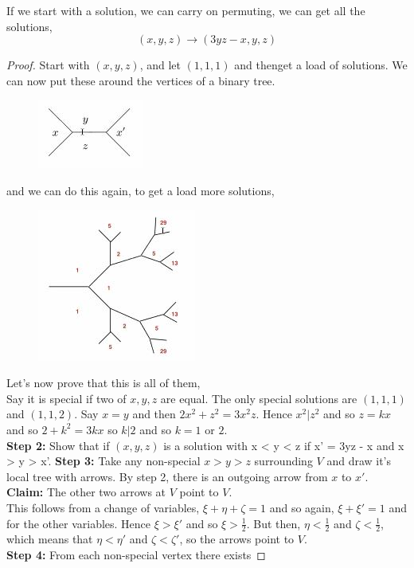 \documentclass{article}
\begin{document}
\begin{nthm}
  If we start with a solution, we can carry on permuting, we can get all the solutions,
  $$ (x, y, z) \to (3yz - x, y, z) $$
\end{nthm}
\begin{proof}
  Start with $(x, y, z)$, and let $(1, 1, 1)$ and thenget a load of solutions. We can now put these around the vertices of a binary tree.
  \begin{figure}[!ht]
    \centering
    \includegraphics{./figures/L1.1}
  \end{figure}
  and we can do this again, to get a load more solutions,
  \begin{figure}[!ht]
    \centering
    \includegraphics{./figures/L1.2}
  \end{figure}
  Let's now prove that this is all of them, \\
  Say it is special if two of $x, y, z$ are equal. The only special solutions are $(1, 1, 1)$ and $(1, 1, 2)$. Say $x = y$ and then $2x^2 + z^2 = 3x^2z$. Hence $x^2|z^2$ and so $z = kx$ and so $2 + k^2= 3kx$ so $k|2$ and so $k = 1$ or $2$.\\
  \textbf{Step 2:}
  Show that if $(x, y, z)$ is a solution with x < y < z if x' = 3yz - x and x > y > x'.
  \textbf{Step 3:} Take any non-special $x > y > z$ surrounding $V$ and draw it's local tree with arrows. By step 2, there is an outgoing arrow from $x$ to $x'$.
  \textbf{Claim:} The other two arrows at $V$ point to $V$. \\
  This follows from a change of variables, $\xi + \eta+\zeta = 1$ and so again, $\xi + \xi'=1$ and for the other variables. Hence $\xi > \xi'$ and so $\xi > \frac{1}{2}$. But then, $\eta < \frac{1}{2}$ and $\zeta < \frac{1}{2}$, which means that $\eta < \eta'$ and $\zeta < \zeta'$, so the arrows point to $V$.\\
  \textbf{Step 4:} From each non-special vertex there exists
\end{proof}
\end{document}
